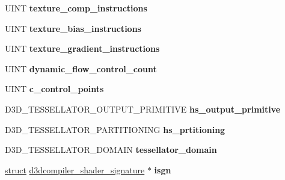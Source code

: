 \begin{DoxyCompactItemize}
U\+I\+NT {\bfseries texture\+\_\+comp\+\_\+instructions}
\item 
\mbox{\label{structd3dcompiler__shader__reflection_ad62384b469b5634fec5dba6b8c8093d7}} 
U\+I\+NT {\bfseries texture\+\_\+bias\+\_\+instructions}
\item 
\mbox{\label{structd3dcompiler__shader__reflection_a0ad30e29db357fca48b849766c93412a}} 
U\+I\+NT {\bfseries texture\+\_\+gradient\+\_\+instructions}
\item 
\mbox{\label{structd3dcompiler__shader__reflection_aee31233335db0858086fbb3129f24e39}} 
U\+I\+NT {\bfseries dynamic\+\_\+flow\+\_\+control\+\_\+count}
\item 
\mbox{\label{structd3dcompiler__shader__reflection_a0c39e1f968f34134d0dd2c7ee9b79515}} 
U\+I\+NT {\bfseries c\+\_\+control\+\_\+points}
\item 
\mbox{\label{structd3dcompiler__shader__reflection_a2184bf11c7dfc0924fcc61c72dc9555d}} 
D3\+D\+\_\+\+T\+E\+S\+S\+E\+L\+L\+A\+T\+O\+R\+\_\+\+O\+U\+T\+P\+U\+T\+\_\+\+P\+R\+I\+M\+I\+T\+I\+VE {\bfseries hs\+\_\+output\+\_\+primitive}
\item 
\mbox{\label{structd3dcompiler__shader__reflection_a84bb35492502b347047fc90bfd1ad4d7}} 
D3\+D\+\_\+\+T\+E\+S\+S\+E\+L\+L\+A\+T\+O\+R\+\_\+\+P\+A\+R\+T\+I\+T\+I\+O\+N\+I\+NG {\bfseries hs\+\_\+prtitioning}
\item 
\mbox{\label{structd3dcompiler__shader__reflection_ab80fd8245447d9f3028fc2979c7feb2e}} 
D3\+D\+\_\+\+T\+E\+S\+S\+E\+L\+L\+A\+T\+O\+R\+\_\+\+D\+O\+M\+A\+IN {\bfseries tessellator\+\_\+domain}
\item 
\mbox{\label{structd3dcompiler__shader__reflection_aa439acc0140a67644bb1041d3bdb8bca}} 
\hyperlink{interfacestruct}{struct} \hyperlink{structd3dcompiler__shader__signature}{d3dcompiler\+\_\+shader\+\_\+signature} $\ast$ {\bfseries isgn}
\item 

\end{DoxyCompactItemize}
